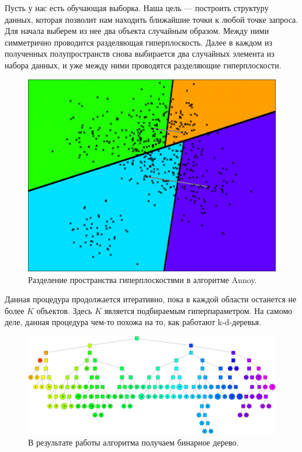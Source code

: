 Пусть у нас есть обучающая выборка. Наша цель — построить структуру данных, которая позволит нам находить ближайшие точки к любой точке запроса. Для начала выберем из нее два объекта случайным образом. Между ними симметрично проводится разделяющая гиперплоскость. Далее в каждом из полученных полупространств снова выбирается два случайных элемента из набора данных, и уже между ними проводятся разделяющие гиперплоскости.

\begin{figure}[ht]
    \centering
    \includegraphics[width=\textwidth]{chapters/metric/images/tree-2.png}
    \caption{Разделение пространства гиперплоскостями в алгоритме Annoy.}
    \label{fig:annoy}
\end{figure}

Данная процедура продолжается итеративно, пока в каждой области останется не более $K$ объектов. Здесь $K$ является подбираемым гиперпараметром. На самомо деле, данная процедура чем-то похожа на то, как работают k-d-деревья.

\begin{figure}[ht]
    \centering
    \includegraphics[width=\textwidth]{chapters/metric/images/tree-full.png}
    \caption{В результате работы алгоритма получаем бинарное дерево.}
    \label{fig:full-tree}
\end{figure}

